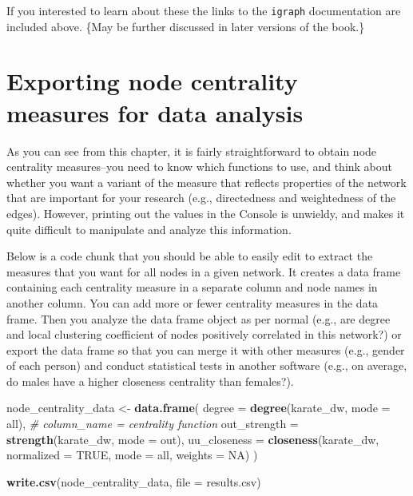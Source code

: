\documentclass[
]{book}
\newenvironment{Shaded}{\begin{snugshade}}{\end{snugshade}}
\newcommand{\AttributeTok}[1]{\textcolor[rgb]{0.13,0.29,0.53}{#1}}
\newcommand{\CommentTok}[1]{\textcolor[rgb]{0.56,0.35,0.01}{\textit{#1}}}
\newcommand{\ConstantTok}[1]{\textcolor[rgb]{0.56,0.35,0.01}{#1}}
\newcommand{\FunctionTok}[1]{\textcolor[rgb]{0.13,0.29,0.53}{\textbf{#1}}}
\newcommand{\NormalTok}[1]{#1}
\newcommand{\OtherTok}[1]{\textcolor[rgb]{0.56,0.35,0.01}{#1}}
\newcommand{\StringTok}[1]{\textcolor[rgb]{0.31,0.60,0.02}{#1}}
\begin{document}
If you interested to learn about these the links to the \texttt{igraph} documentation are included above. \{May be further discussed in later versions of the book.\}

\section{Exporting node centrality measures for data analysis}\label{exporting-node-centrality-measures-for-data-analysis}

As you can see from this chapter, it is fairly straightforward to obtain node centrality measures--you need to know which functions to use, and think about whether you want a variant of the measure that reflects properties of the network that are important for your research (e.g., directedness and weightedness of the edges). However, printing out the values in the Console is unwieldy, and makes it quite difficult to manipulate and analyze this information.

Below is a code chunk that you should be able to easily edit to extract the measures that you want for all nodes in a given network. It creates a data frame containing each centrality measure in a separate column and node names in another column. You can add more or fewer centrality measures in the data frame. Then you analyze the data frame object as per normal (e.g., are degree and local clustering coefficient of nodes positively correlated in this network?) or export the data frame so that you can merge it with other measures (e.g., gender of each person) and conduct statistical tests in another software (e.g., on average, do males have a higher closeness centrality than females?).

\begin{Shaded}
\begin{Highlighting}[]
\NormalTok{node\_centrality\_data }\OtherTok{\textless{}{-}} \FunctionTok{data.frame}\NormalTok{(}
    \AttributeTok{degree =} \FunctionTok{degree}\NormalTok{(karate\_dw, }\AttributeTok{mode =} \StringTok{\textquotesingle{}all\textquotesingle{}}\NormalTok{), }\CommentTok{\# column\_name = centrality function }
    \AttributeTok{out\_strength =} \FunctionTok{strength}\NormalTok{(karate\_dw, }\AttributeTok{mode =} \StringTok{\textquotesingle{}out\textquotesingle{}}\NormalTok{),}
    \AttributeTok{uu\_closeness =} \FunctionTok{closeness}\NormalTok{(karate\_dw, }\AttributeTok{normalized =} \ConstantTok{TRUE}\NormalTok{, }\AttributeTok{mode =} \StringTok{\textquotesingle{}all\textquotesingle{}}\NormalTok{, }\AttributeTok{weights =} \ConstantTok{NA}\NormalTok{)}
\NormalTok{    )}

\FunctionTok{write.csv}\NormalTok{(node\_centrality\_data, }\AttributeTok{file =} \StringTok{\textquotesingle{}results.csv\textquotesingle{}}\NormalTok{)}
\end{Highlighting}
\end{Shaded}
\end{document}

